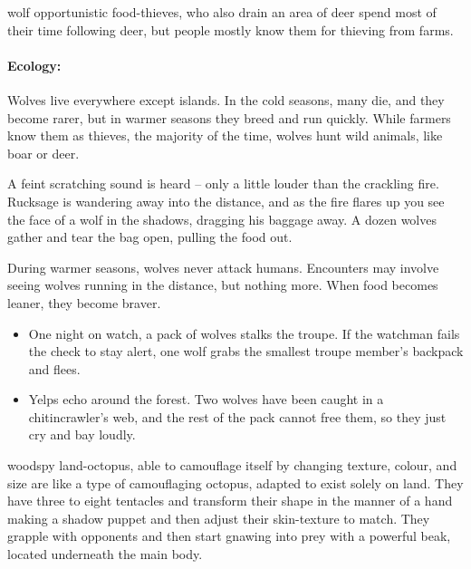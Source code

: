 \begin{multicols}{2}
\stirgeSwarm

  {wolf}%
  {opportunistic food-thieves, who also drain an area of deer}%
spend most of their time following deer, but people mostly know them for thieving from farms.

\paragraph{Ecology:} Wolves live everywhere except islands.
In the cold seasons, many die, and they become rarer, but in warmer seasons they breed and run quickly.
While farmers know them as thieves, the majority of the time, wolves hunt wild animals, like boar or deer.

\begin{boxtext}
  A feint scratching sound is heard -- only a little louder than the crackling fire.
  Rucksage is wandering away into the distance, and as the fire flares up you see the face of a wolf in the shadows, dragging his baggage away.
  A dozen wolves gather and tear the bag open, pulling the food out.
\end{boxtext}


\showEnc
During warmer seasons, wolves never attack humans.
Encounters may involve seeing wolves running in the distance, but nothing more.
When food becomes leaner, they become braver.

\begin{itemize}
  \item
  One night on watch, a pack of wolves stalks the troupe.
  If the watchman fails the  check to stay alert, one wolf grabs the smallest troupe member's backpack and flees.
  \item
  Yelps echo around the forest.
  Two wolves have been caught in a chitincrawler's web, and the rest of the pack cannot free them, so they just cry and bay loudly.
\end{itemize}

  {woodspy}%
  {land-octopus, able to camouflage itself by changing texture, colour, and size}%
are like a type of camouflaging octopus, adapted to exist solely on land.
They have three to eight tentacles and transform their shape in the manner of a hand making a shadow puppet and then adjust their skin-texture to match.
They grapple with opponents and then start gnawing into prey with a powerful beak, located underneath the main body.


\end{multicols}
